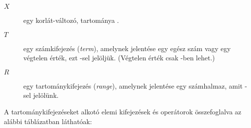 \begin{description}
\item[$X$] egy korlát-változó, tartománya . \vspace*{-1ex}
\item[$T$] egy számkifejezés ({\em term}), amelynek jelentése
egy egész szám vagy egy végtelen érték, ezt -sel jelöljük.
(Végtelen érték csak -ben lehet.) \vspace*{-1ex}
\item[$R$] egy tartománykifejezés ({\em range}), amelynek jelentése
egy számhalmaz, amit -sel jelölünk.
\end{description}

A tartománykifejezéseket alkotó elemi kifejezések és operátorok összefoglalva az
alábbi táblázatban láthatóak:

